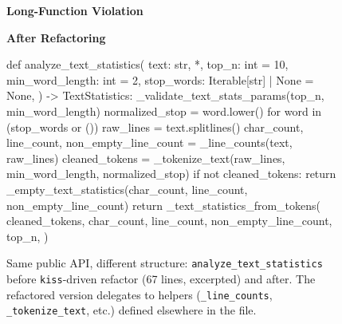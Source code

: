 \documentclass[11pt]{article}
\begin{document}
\begin{figure}[ht]
  \centering
  \begin{minipage}[t]{0.48\textwidth}
    \centering
    \textbf{Long-Function Violation}\\[0.4em]
  \end{minipage}\hfill
  \begin{minipage}[t]{0.48\textwidth}
    \centering
    \textbf{After Refactoring}\\[0.4em]
    \begin{pycode}
def analyze_text_statistics(
    text: str,
    *,
    top_n: int = 10,
    min_word_length: int = 2,
    stop_words: Iterable[str] | None = None,
) -> TextStatistics:
    _validate_text_stats_params(top_n, min_word_length)
    normalized_stop = {word.lower() for word in (stop_words or ())}
    raw_lines = text.splitlines()
    char_count, line_count, non_empty_line_count = _line_counts(text, raw_lines)
    cleaned_tokens = _tokenize_text(raw_lines, min_word_length, normalized_stop)
    if not cleaned_tokens:
        return _empty_text_statistics(char_count, line_count, non_empty_line_count)
    return _text_statistics_from_tokens(
        cleaned_tokens,
        char_count,
        line_count,
        non_empty_line_count,
        top_n,
    )
    \end{pycode}
  \end{minipage}
  \caption{Same public API, different structure: \texttt{analyze\_text\_statistics} before \texttt{kiss}-driven
   refactor (67 lines, excerpted) and after. The refactored version delegates to helpers (\texttt{\_line\_counts}, \texttt{\_tokenize\_text}, etc.) defined elsewhere in the file.}
  \label{fig:analyze-text-stats}
\end{figure}
\end{document}

